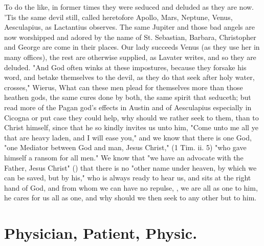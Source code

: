 {To do the like, in former times they were seduced and deluded as they are now.
'Tis the same devil still, called heretofore Apollo, Mars, Neptune, Venus,
Aesculapius, \etc{} as Lactantius
 observes. The same
Jupiter and those bad angels are now worshipped and adored by the name of St.
Sebastian, Barbara, \etc{} Christopher and George are come in their places. Our
lady succeeds Venus (as they use her in many offices), the rest are otherwise
supplied, as Lavater writes, and so they are deluded.
"And God often winks at these impostures, because they
forsake his word, and betake themselves to the devil, as they do that seek
after holy water, crosses," \etc{} Wierus,  What can these men plead for themselves more than those heathen gods, the
same cures done by both, the same spirit that seduceth; but read more of the
Pagan god's effects in Austin  and of Aesculapius especially in Cicogna  or put case they could help, why should we rather seek to them, than to
Christ himself, since that he so kindly invites us unto him, "Come unto me all
ye that are heavy laden, and I will ease you,"  and we
know that there is one God, "one Mediator between God and man, Jesus Christ,"
(1 Tim. ii. 5) "who gave himself a ransom for all men." We know that "we have
an advocate with the Father, Jesus Christ" () that there is no "other name under heaven, by which we can
be saved, but by his," who is always ready to hear us, and sits at the right
hand of God, and from whom we can have no repulse,
, we are all as one to him,
he cares for us all as one, and why should we then seek to any other but to
him.


\section{Physician, Patient, Physic.}

}

